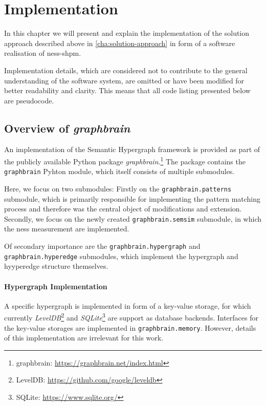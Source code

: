 \documentclass[11pt]{scrreprt}
\begin{document}



\chapter{Implementation}
\label{cha:implementation}

In this chapter we will present and explain the implementation of the solution approach described above in \cref{cha:solution-approach} in form of a software realisation of \gls{ness-shpm}.

Implementation details, which are considered not to contribute to the general understanding of the software system, are omitted or  have been modified for better readability and clarity. This means that all code listing presented below are pseudocode.



\section{Overview of \textit{graphbrain}}
An implementation of the Semantic Hypergraph framework is provided as part of the publicly available Python package \textit{graphbrain}.\footnote{graphbrain: \url{https://graphbrain.net/index.html}} The package contains the \texttt{graphbrain} Pyhton module, which itself consists of multiple submodules. 

Here, we focus on two submodules: Firstly on the \texttt{graphbrain.patterns} submodule, which is primarily responsible for implementing the pattern matching process and therefore was the central object  of modifications and extension. Secondly, we focus on the newly created \texttt{graphbrain.semsim} submodule, in which the \gls{ness} measurement are implemented.

Of secondary importance are the \texttt{graphbrain.hypergraph} and \texttt{graphbrain.hyperedge} submodules, which implement the hypergraph and hyyperedge structure themselves. 


\subsubsection{Hypergraph Implementation}
A specific hypergraph is implemented in form of a key-value storage, for which currently \textit{LevelDB}\footnote{LevelDB: \url{https://github.com/google/leveldb}} and \textit{SQLite}\footnote{SQLite: \url{https://www.sqlite.org/}} are support as database backends. Interfaces for the key-value storages are implemented in \texttt{graphbrain.memory}. However, details of this implementation are irrelevant for this work.
\end{document}
